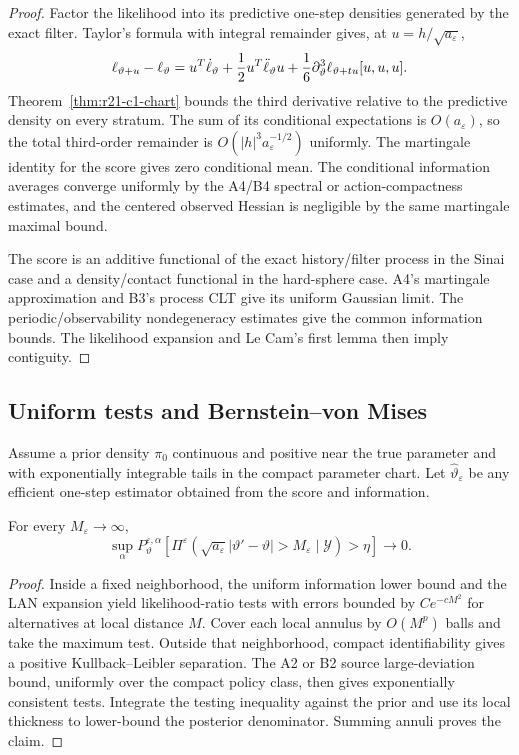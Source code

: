 \begin{proof}
Factor the likelihood into its predictive one-step densities generated by the
exact filter.  Taylor's formula with integral remainder gives, at
$u=h/\sqrt{a_\varepsilon}$,
\[
 \ell_{\vartheta+u}-\ell_\vartheta
 =u^T\dot\ell_\vartheta+
 {1\over2}u^T\ddot\ell_\vartheta u+
 {1\over6}\partial_\vartheta^3\ell_{\vartheta+tu}[u,u,u].
\]
Theorem~\ref{thm:r21-c1-chart} bounds the third derivative relative to the
predictive density on every stratum.  The sum of its conditional expectations
is $O(a_\varepsilon)$, so the total third-order remainder is
$O(|h|^3a_\varepsilon^{-1/2})$ uniformly.  The martingale identity for the
score gives zero conditional mean.  The conditional information averages
converge uniformly by the A4/B4 spectral or action-compactness estimates, and
the centered observed Hessian is negligible by the same martingale maximal
bound.

The score is an additive functional of the exact history/filter process in
the Sinai case and a density/contact functional in the hard-sphere case.
A4's martingale approximation and B3's process CLT give its uniform Gaussian
limit.  The periodic/observability nondegeneracy estimates give the common
information bounds.  The likelihood expansion and Le Cam's first lemma then
imply contiguity.
\end{proof}

\subsection{Uniform tests and Bernstein--von Mises}

Assume a prior density $\pi_0$ continuous and positive near the true parameter
and with exponentially integrable tails in the compact parameter chart.  Let
$\widehat\vartheta_\varepsilon$ be any efficient one-step estimator obtained
from the score and information.

\begin{lemma}
\label{lem:r21-c1-tests}
For every $M_\varepsilon\to\infty$,
\[
 \sup_\alpha
 P_\vartheta^{\varepsilon,\alpha}
 \left[\Pi^\varepsilon\left(
 \sqrt{a_\varepsilon}|\vartheta'-\vartheta|>M_\varepsilon
 \mid\mathcal Y\right)>\eta\right]\to0.
\]
\end{lemma}

\begin{proof}
Inside a fixed neighborhood, the uniform information lower bound and the LAN
expansion yield likelihood-ratio tests with errors bounded by
$Ce^{-cM^2}$ for alternatives at local distance $M$.  Cover each local annulus
by $O(M^p)$ balls and take the maximum test.  Outside that neighborhood,
compact identifiability gives a positive Kullback--Leibler separation.  The A2
or B2 source large-deviation bound, uniformly over the compact policy class,
then gives exponentially consistent tests.  Integrate the testing inequality
against the prior and use its local thickness to lower-bound the posterior
denominator.  Summing annuli proves the claim.
\end{proof}

